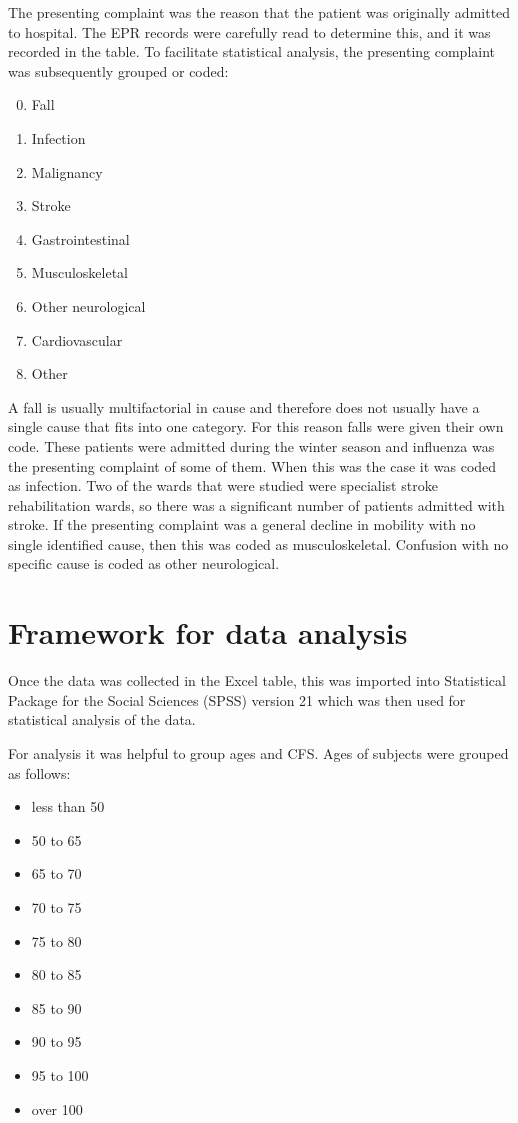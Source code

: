 \documentclass
[
	12pt,
	a4paper,
	oneside,
]{report}
\begin{document}
The presenting complaint was the reason that the patient was originally 
admitted to hospital. The EPR records were carefully read to determine this,
and it was recorded in the table. To facilitate statistical analysis, the 
presenting complaint was subsequently grouped or coded:
\begin{enumerate}
\setcounter{enumi}{-1}
\item Fall
\item Infection
\item Malignancy
\item Stroke
\item Gastrointestinal
\item Musculoskeletal
\item Other neurological
\item Cardiovascular
\item Other
\end{enumerate}

A fall is usually multifactorial in cause \parencite{silver:12} and therefore
does not usually have a single cause that fits into one category. For this 
reason falls were given their own code.
These patients were admitted during the winter season and influenza was the
presenting complaint of some of them. When this was the case it was coded as
infection. Two of the wards that were studied were specialist stroke 
rehabilitation wards, so there was a significant number of patients admitted
with stroke. If the presenting complaint was a general decline in mobility 
with no single identified cause, then this was coded as musculoskeletal.
Confusion with no specific cause is coded as other neurological.



\section{Framework for data analysis}

Once the data was collected in the Excel table, this was imported into 
Statistical Package for the Social Sciences (SPSS) version 21 which was then
used for statistical analysis of the data.

For analysis it was helpful to group ages and CFS. Ages of subjects were 
grouped as follows:
\begin{itemize}
	\item less than 50
	\item 50 to 65
	\item 65 to 70
	\item 70 to 75
 	\item 75 to 80
	\item 80 to 85
 	\item 85 to 90
 	\item 90 to 95
 	\item 95 to 100
 	\item over 100
\end{itemize}
\end{document}
